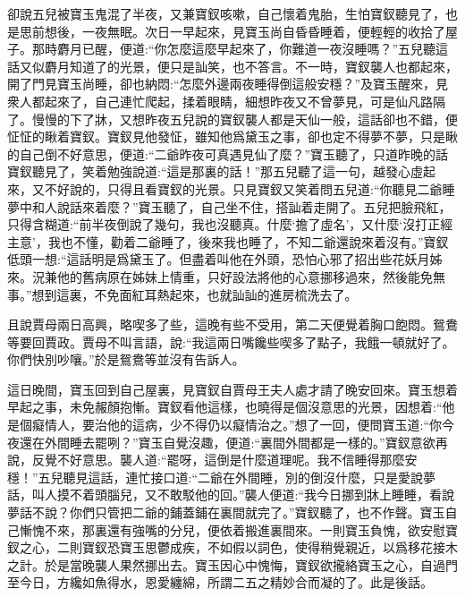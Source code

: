 \begin{parag}
    卻說五兒被寶玉鬼混了半夜，又兼寶釵咳嗽，自己懷着鬼胎，生怕寶釵聽見了，也是思前想後，一夜無眠。次日一早起來，見寶玉尚自昏昏睡着，便輕輕的收拾了屋子。那時麝月已醒，便道:“你怎麼這麼早起來了，你難道一夜沒睡嗎？”五兒聽這話又似麝月知道了的光景，便只是訕笑，也不答言。不一時，寶釵襲人也都起來，開了門見寶玉尚睡，卻也納悶:“怎麼外邊兩夜睡得倒這般安穩？”及寶玉醒來，見衆人都起來了，自己連忙爬起，揉着眼睛，細想昨夜又不曾夢見，可是仙凡路隔了。慢慢的下了牀，又想昨夜五兒說的寶釵襲人都是天仙一般，這話卻也不錯，便怔怔的瞅着寶釵。寶釵見他發怔，雖知他爲黛玉之事，卻也定不得夢不夢，只是瞅的自己倒不好意思，便道:“二爺昨夜可真遇見仙了麼？”寶玉聽了，只道昨晚的話寶釵聽見了，笑着勉強說道:“這是那裏的話！”那五兒聽了這一句，越發心虛起來，又不好說的，只得且看寶釵的光景。只見寶釵又笑着問五兒道:“你聽見二爺睡夢中和人說話來着麼？”寶玉聽了，自己坐不住，搭訕着走開了。五兒把臉飛紅，只得含糊道:“前半夜倒說了幾句，我也沒聽真。什麼‘擔了虛名’，又什麼‘沒打正經主意’，我也不懂，勸着二爺睡了，後來我也睡了，不知二爺還說來着沒有。”寶釵低頭一想:“這話明是爲黛玉了。但盡着叫他在外頭，恐怕心邪了招出些花妖月姊來。況兼他的舊病原在姊妹上情重，只好設法將他的心意挪移過來，然後能免無事。”想到這裏，不免面紅耳熱起來，也就訕訕的進房梳洗去了。
\end{parag}


\begin{parag}
    且說賈母兩日高興，略喫多了些，這晚有些不受用，第二天便覺着胸口飽悶。鴛鴦等要回賈政。賈母不叫言語，說:“我這兩日嘴饞些喫多了點子，我餓一頓就好了。你們快別吵嚷。”於是鴛鴦等並沒有告訴人。
\end{parag}


\begin{parag}
    這日晚間，寶玉回到自己屋裏，見寶釵自賈母王夫人處才請了晚安回來。寶玉想着早起之事，未免赧顏抱慚。寶釵看他這樣，也曉得是個沒意思的光景，因想着:“他是個癡情人，要治他的這病，少不得仍以癡情治之。”想了一回，便問寶玉道:“你今夜還在外間睡去罷咧？”寶玉自覺沒趣，便道:“裏間外間都是一樣的。”寶釵意欲再說，反覺不好意思。襲人道:“罷呀，這倒是什麼道理呢。我不信睡得那麼安穩！”五兒聽見這話，連忙接口道:“二爺在外間睡，別的倒沒什麼，只是愛說夢話，叫人摸不着頭腦兒，又不敢駁他的回。”襲人便道:“我今日挪到牀上睡睡，看說夢話不說？你們只管把二爺的鋪蓋鋪在裏間就完了。”寶釵聽了，也不作聲。寶玉自己慚愧不來，那裏還有強嘴的分兒，便依着搬進裏間來。一則寶玉負愧，欲安慰寶釵之心，二則寶釵恐寶玉思鬱成疾，不如假以詞色，使得稍覺親近，以爲移花接木之計。於是當晚襲人果然挪出去。寶玉因心中愧悔，寶釵欲攏絡寶玉之心，自過門至今日，方纔如魚得水，恩愛纏綿，所謂二五之精妙合而凝的了。此是後話。
\end{parag}



